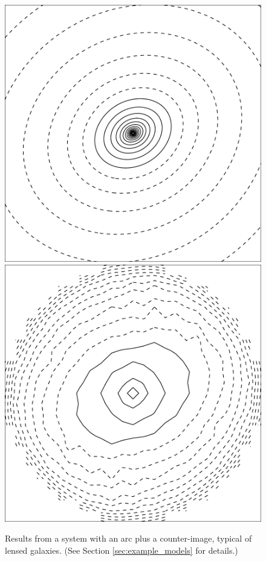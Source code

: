 \begin{figure}
  \includegraphics[width=\myplotswidth]{fig/ASW0004oux_006990_kappa}
  \includegraphics[width=\myplotswidth]{fig/006990_mass}

  \caption[result 6990 (ASW0004oux)]{Results from a system with an arc
    plus a counter-image, typical of lensed galaxies. (See Section
    \ref{sec:example_models} for details.)}
  \label{fig:6990}
\end{figure}



